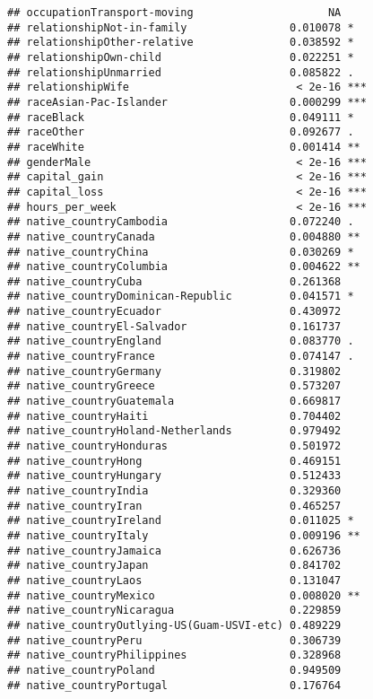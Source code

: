 \documentclass[]{article}
\begin{document}
\begin{verbatim}
## occupationTransport-moving                     NA    
## relationshipNot-in-family                0.010078 *  
## relationshipOther-relative               0.038592 *  
## relationshipOwn-child                    0.022251 *  
## relationshipUnmarried                    0.085822 .  
## relationshipWife                          < 2e-16 ***
## raceAsian-Pac-Islander                   0.000299 ***
## raceBlack                                0.049111 *  
## raceOther                                0.092677 .  
## raceWhite                                0.001414 ** 
## genderMale                                < 2e-16 ***
## capital_gain                              < 2e-16 ***
## capital_loss                              < 2e-16 ***
## hours_per_week                            < 2e-16 ***
## native_countryCambodia                   0.072240 .  
## native_countryCanada                     0.004880 ** 
## native_countryChina                      0.030269 *  
## native_countryColumbia                   0.004622 ** 
## native_countryCuba                       0.261368    
## native_countryDominican-Republic         0.041571 *  
## native_countryEcuador                    0.430972    
## native_countryEl-Salvador                0.161737    
## native_countryEngland                    0.083770 .  
## native_countryFrance                     0.074147 .  
## native_countryGermany                    0.319802    
## native_countryGreece                     0.573207    
## native_countryGuatemala                  0.669817    
## native_countryHaiti                      0.704402    
## native_countryHoland-Netherlands         0.979492    
## native_countryHonduras                   0.501972    
## native_countryHong                       0.469151    
## native_countryHungary                    0.512433    
## native_countryIndia                      0.329360    
## native_countryIran                       0.465257    
## native_countryIreland                    0.011025 *  
## native_countryItaly                      0.009196 ** 
## native_countryJamaica                    0.626736    
## native_countryJapan                      0.841702    
## native_countryLaos                       0.131047    
## native_countryMexico                     0.008020 ** 
## native_countryNicaragua                  0.229859    
## native_countryOutlying-US(Guam-USVI-etc) 0.489229    
## native_countryPeru                       0.306739    
## native_countryPhilippines                0.328968    
## native_countryPoland                     0.949509    
## native_countryPortugal                   0.176764    

\end{verbatim}
\end{document}
